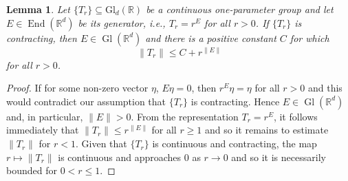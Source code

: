 \documentclass[11pt]{article}
\newtheorem{lemma}[theorem]{Lemma}
\theoremstyle{remark}
\newcommand\End{\operatorname{End}} %
\newcommand\GldR{\mbox{Gl}_d(\mathbb{R})}%
\newcommand\Gl{\operatorname{Gl}} %
\begin{document}
\begin{lemma}\label{lem:OperatorBoundsforContractingGroup}
Let $\{T_r\}\subseteq\GldR$ be a continuous one-parameter group and let $E\in\End(\mathbb{R}^d)$ be its generator, i.e., $T_r=r^E$ for all $r>0$. If $\{T_r\}$ is contracting, then $E\in\Gl(\mathbb{R}^d)$ and there is a positive constant $C$ for which
\begin{equation*}
\|T_r\|\leq C+r^{\|E\|}
\end{equation*}
for all $r>0$.
\end{lemma}
\begin{proof}
If for some non-zero vector $\eta$, $E\eta=0$, then $r^E\eta=\eta$ for all $r>0$ and this would contradict our assumption that $\{T_r\}$ is contracting. Hence $E\in\Gl(\mathbb{R}^d)$ and, in particular, $\|E\|>0$. From the representation $T_r=r^E$, it follows immediately that $\|T_r\|\leq r^{\|E\|}$ for all $r\geq 1$ and so it remains to estimate $\|T_r\|$ for $r<1$. Given that $\{T_r\}$ is continuous and contracting, the map $r\mapsto \|T_r\|$ is continuous and approaches $0$ as $r\rightarrow 0$ and so it is necessarily bounded for $0<r\leq 1$.
\end{proof}
\end{document}
